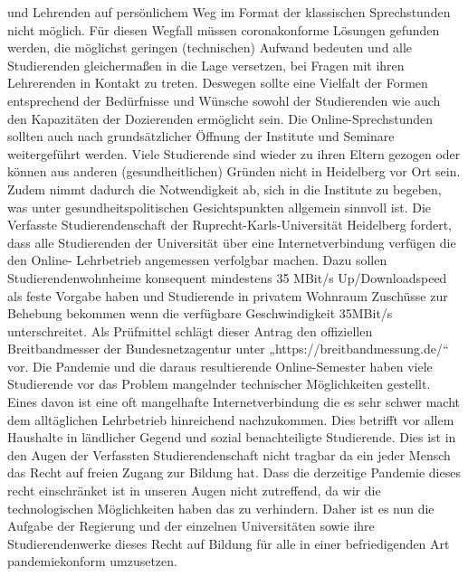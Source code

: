 {        und Lehrenden auf persönlichem Weg im Format der klassischen Sprechstunden nicht
        möglich. Für diesen Wegfall müssen coronakonforme Lösungen gefunden werden, die
        möglichst geringen (technischen) Aufwand bedeuten und alle Studierenden
        gleichermaßen in die Lage versetzen, bei Fragen mit ihren Lehrerenden in Kontakt zu
        treten. Deswegen sollte eine Vielfalt der Formen entsprechend der Bedürfnisse und
        Wünsche sowohl der Studierenden wie auch den Kapazitäten der Dozierenden
        ermöglicht sein. Die Online-Sprechstunden sollten auch nach grundsätzlicher Öffnung
        der Institute und Seminare weitergeführt werden. Viele Studierende sind wieder zu ihren 
        Eltern gezogen oder können aus anderen (gesundheitlichen) Gründen nicht in Heidelberg
        vor Ort sein. Zudem nimmt dadurch die Notwendigkeit ab, sich in die Institute zu
        begeben, was unter gesundheitspolitischen Gesichtspunkten allgemein sinnvoll ist.
    }{
    }{
    }
    {
        Die Verfasste Studierendenschaft der Ruprecht-Karls-Universität Heidelberg fordert,
        dass alle Studierenden der Universität über eine Internetverbindung verfügen die den
        Online- Lehrbetrieb angemessen verfolgbar machen. Dazu sollen
        Studierendenwohnheime konsequent mindestens 35 MBit/s Up/Downloadspeed als feste
        Vorgabe haben und Studierende in privatem Wohnraum Zuschüsse zur Behebung
        bekommen wenn die verfügbare Geschwindigkeit 35MBit/s unterschreitet. Als
        Prüfmittel schlägt dieser Antrag den offiziellen Breitbandmesser der
        Bundesnetzagentur
        unter „https://breitbandmessung.de/“ vor.
    }{
        Die Pandemie und die daraus resultierende Online-Semester haben viele Studierende vor
        das Problem mangelnder technischer Möglichkeiten gestellt. Eines davon ist eine oft
        mangelhafte Internetverbindung die es sehr schwer macht dem alltäglichen Lehrbetrieb
        hinreichend nachzukommen. Dies betrifft vor allem Haushalte in ländlicher Gegend und
        sozial benachteiligte Studierende. Dies ist in den Augen der Verfassten
        Studierendenschaft nicht tragbar da ein jeder Mensch das Recht auf freien Zugang zur
        Bildung hat. Dass die derzeitige Pandemie dieses recht einschränket ist in unseren Augen
        nicht zutreffend, da wir die technologischen Möglichkeiten haben das zu verhindern.
        Daher ist es nun die Aufgabe der Regierung und der einzelnen Universitäten sowie ihre
        Studierendenwerke dieses Recht auf Bildung für alle in einer befriedigenden Art
        pandemiekonform umzusetzen.
    }{
    }{
    }
